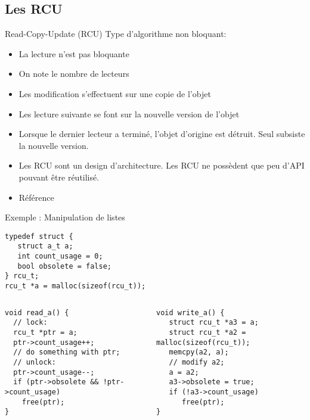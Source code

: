 \subsection{Les RCU}

\begin{frame}[fragile=singleslide]{Read-Copy-Update (RCU)}
  Type d'algorithme non bloquant:
  \begin{itemize} 
  \item La lecture n'est pas bloquante
  \item On note le nombre de lecteurs
  \item Les modification s'effectuent sur une copie de l'objet
  \item  Les lecture  suivante  se  font sur  la  nouvelle version  de
    l'objet
  \item Lorsque  le dernier lecteur  a terminé, l'objet  d'origine est
    détruit. Seul subsiste la nouvelle version.
  \item Les  RCU sont un  design d'architecture. Les RCU  ne possèdent
    que peu d'API pouvant être réutilisé.
  \item        Référence        
  \end{itemize} 
\end{frame}

\begin{frame}[fragile]{Exemple : Manipulation de listes} 
  \begin{center}
    \begin{lstlisting}[basicstyle=\ttfamily\scriptsize\color{colBasic},commentstyle=\scriptsize\itshape\color{colComments},numbers=none]
typedef struct {
   struct a_t a;
   int count_usage = 0;
   bool obsolete = false;
} rcu_t;
rcu_t *a = malloc(sizeof(rcu_t)); 
    \end{lstlisting}
  \end{center}
  \begin{columns}
    \begin{column}{5cm}
      \begin{lstlisting}[basicstyle=\ttfamily\scriptsize\color{colBasic},commentstyle=\scriptsize\itshape\color{colComments},numbers=none]
void read_a() {
  // lock:
  rcu_t *ptr = a;
  ptr->count_usage++;
  // do something with ptr;
  // unlock:
  ptr->count_usage--;
  if (ptr->obsolete && !ptr->count_usage)
    free(ptr);
}
      \end{lstlisting}
    \end{column}
    \begin{column}{5cm}
      \begin{lstlisting}[basicstyle=\ttfamily\scriptsize\color{colBasic},commentstyle=\scriptsize\itshape\color{colComments},numbers=none]
void write_a() { 
   struct rcu_t *a3 = a;
   struct rcu_t *a2 = malloc(sizeof(rcu_t));
   memcpy(a2, a);
   // modify a2;   
   a = a2;  
   a3->obsolete = true;
   if (!a3->count_usage)
      free(ptr);
}
      \end{lstlisting} 
    \end{column}
  \end{columns}
\end{frame} 

